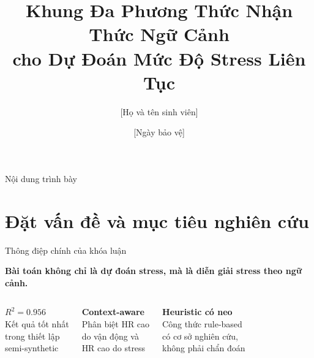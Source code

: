 \documentclass[11pt]{beamer}
\title[Stress Prediction]{Khung Đa Phương Thức Nhận Thức Ngữ Cảnh\\cho Dự Đoán Mức Độ Stress Liên Tục}
\author{[Họ và tên sinh viên]}
\institute{[Khoa/Trường] \\ GVHD: [Tên giảng viên hướng dẫn]}
\date{[Ngày bảo vệ]}
\begin{document}
\begin{frame}
\titlepage
\end{frame}

\begin{frame}{Nội dung trình bày}
\tableofcontents
\end{frame}

\section{Đặt vấn đề và mục tiêu nghiên cứu}

\begin{frame}{Thông điệp chính của khóa luận}
\small
\begin{center}
\large\textbf{Bài toán không chỉ là dự đoán stress, mà là diễn giải stress theo ngữ cảnh.}
\end{center}

\vspace{0.15cm}
\begin{columns}[T]
\centering
\textbf{\textcolor{insightblue}{$R^2 = 0.956$}}\\[0.1cm]
\small Kết quả tốt nhất\\trong thiết lập\\semi-synthetic

\centering
\textbf{\textcolor{breakthroughgreen}{Context-aware}}\\[0.1cm]
\small Phân biệt HR cao\\do vận động và\\HR cao do stress

\centering
\textbf{\textcolor{alertred}{Heuristic có neo}}\\[0.1cm]
\small Công thức rule-based\\có cơ sở nghiên cứu,\\không phải chẩn đoán
\end{columns}

\vspace{0.25cm}
\end{frame}
\end{document}
